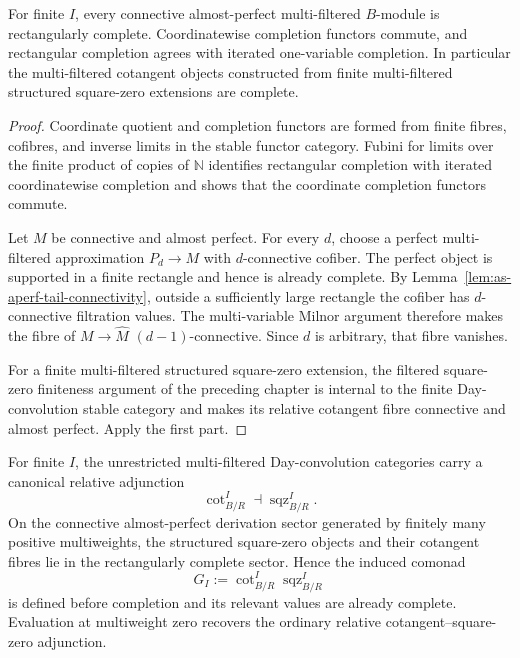 \begin{lemma}
\label{lem:as-multi-filtered-complete}
For finite $I$, every connective almost-perfect multi-filtered $B$-module is
rectangularly complete.  Coordinatewise completion functors commute, and
rectangular completion agrees with iterated one-variable completion.  In
particular the multi-filtered cotangent objects constructed from finite
multi-filtered structured square-zero extensions are complete.
\end{lemma}

\begin{proof}
Coordinate quotient and completion functors are formed from finite fibres,
cofibres, and inverse limits in the stable functor category.  Fubini for limits
over the finite product of copies of $\mathbb N$ identifies rectangular
completion with iterated coordinatewise completion and shows that the
coordinate completion functors commute.

Let $M$ be connective and almost perfect.  For every $d$, choose a perfect
multi-filtered approximation $P_d\to M$ with $d$-connective cofiber.  The
perfect object is supported in a finite rectangle and hence is already
complete.  By Lemma~\ref{lem:as-aperf-tail-connectivity}, outside a
sufficiently large rectangle the cofiber has $d$-connective filtration values.
The multi-variable Milnor argument therefore makes the fibre of
$M\to\widehat M$ $(d-1)$-connective.  Since $d$ is arbitrary, that fibre
vanishes.

For a finite multi-filtered structured square-zero extension, the filtered
square-zero finiteness argument of the preceding chapter is internal to the
finite Day-convolution stable category and makes its relative cotangent fibre
connective and almost perfect.  Apply the first part.
\end{proof}

\begin{proposition}
\label{prop:as-multifiltered-cot-sqz}
For finite $I$, the unrestricted multi-filtered Day-convolution categories
carry a canonical relative adjunction
\[
\boxed{
    \operatorname{cot}^{I}_{B/R}
    \dashv
    \operatorname{sqz}^{I}_{B/R}.
}
\]
On the connective almost-perfect derivation sector generated by finitely many
positive multiweights, the structured square-zero objects and their cotangent
fibres lie in the rectangularly complete sector.  Hence the induced comonad
\[
\boxed{
    G_I
    :=
    \operatorname{cot}^{I}_{B/R}
    \operatorname{sqz}^{I}_{B/R}
}
\]
is defined before completion and its relevant values are already complete.
Evaluation at multiweight zero recovers the ordinary relative
cotangent--square-zero adjunction.
\end{proposition}

